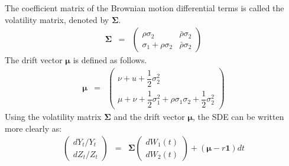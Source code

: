 \documentclass[uplatex,a4j,12pt,dvipdfmx]{jsarticle}
\begin{document}
The coefficient matrix of the Brownian motion differential terms is called the volatility matrix, denoted by
${\bm \Sigma}$.
%
%
\begin{eqnarray}
	{\bm \Sigma}
	&=&
	\left(
	\begin{array}{cc}
			\rho \sigma_{2}              & \bar{\rho} \sigma_{2}
			\\
			\sigma_{1} + \rho \sigma_{2} & \bar{\rho} \sigma_{2}
		\end{array}
	\right)
\end{eqnarray}
%
%
The drift vector ${\bm \mu}$ is defined as follows.
%
%
\begin{eqnarray}
	{\bm \mu}
	&=&
	\left(
	\begin{array}{c}
			\nu + u + \dfrac{1}{2} \sigma_{2}^{2}
			\\
			\mu + \nu + \dfrac{1}{2} \sigma_{1}^{2} + \rho \sigma_{1} \sigma_{2} + \dfrac{1}{2} \sigma_{2}^{2}
		\end{array}
	\right)
\end{eqnarray}
%
%
Using the volatility matrix ${\bm \Sigma}$ and
the drift vector ${\bm \mu}$,
the SDE can be written more clearly as:
%
%
\begin{eqnarray}
	\left(
	\begin{array}{c}
			d Y_{t} / Y_{t}
			\\
			d Z_{t} / Z_{t}
		\end{array}
	\right)
	&=&
	{\bm \Sigma}
	\left(
	\begin{array}{c}
			dW_{1}(t)
			\\
			dW_{2}(t)
		\end{array}
	\right)
	+
	( {\bm \mu} - r {\bm 1} ) dt
\end{eqnarray}
%
%
\end{document}
